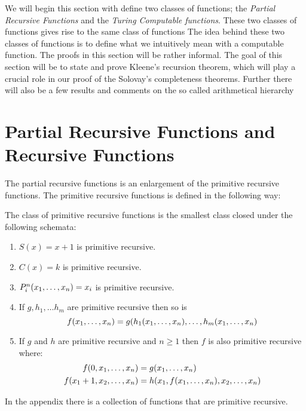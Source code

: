 \documentclass[../main.tex]{subfiles}
\begin{document}
We will begin this section with define two classes of functions;
the \textit{Partial Recursive Functions} and  the \textit{Turing Computable
functions}. These two classes of functions gives rise to the same class of
functions The idea behind these two classes of functions is to define what
we intuitively mean with a computable function. The proofs in this section will
be rather informal. The goal of this section will be to state and prove
Kleene's recursion theorem, which will play a crucial role in our proof of the
Solovay's completeness theorems. Further there will also be a few results and
comments on the so called arithmetical hierarchy 

\section{Partial Recursive Functions and Recursive Functions}
The partial recursive functions is an enlargement of the primitive recursive
functions. The primitive recursive functions is defined in the following way:
\begin{defi}
	The class of primitive recursive functions is the smallest class closed
	under the following schemata:
	\begin{enumerate}[label=\Roman*.]
		\item $S(x)=x+1$ is primitive recursive.
		\item $C(x)=k$ is primitive recursive.
		\item $P^n_i(x_1,\ldots,x_n)=x_i$ is primitive recursive.
		\item If $g,h_1,\ldots h_m$ are primitive recursive then so
			is
			$$f(x_1,\ldots,x_n)=g(h_1(x_1,\ldots,x_n),\ldots,h_m(x_1,\ldots,x_n)$$
		\item If $g$ and $h$ are primitive recursive and $n\geq 1$ then
			$f$ is also primitive recursive where:
			\begin{align*}
				f(0,x_1,\ldots,x_n)&=g(x_1,\ldots,x_n)\\
				f(x_1+1,x_2,\ldots,x_n)&=h(x_1,f(x_1,\ldots,x_n),x_2,\ldots,x_n)
			\end{align*}
	\end{enumerate}
\end{defi}
In the appendix there is a collection of functions that are
primitive recursive.
\end{document}
